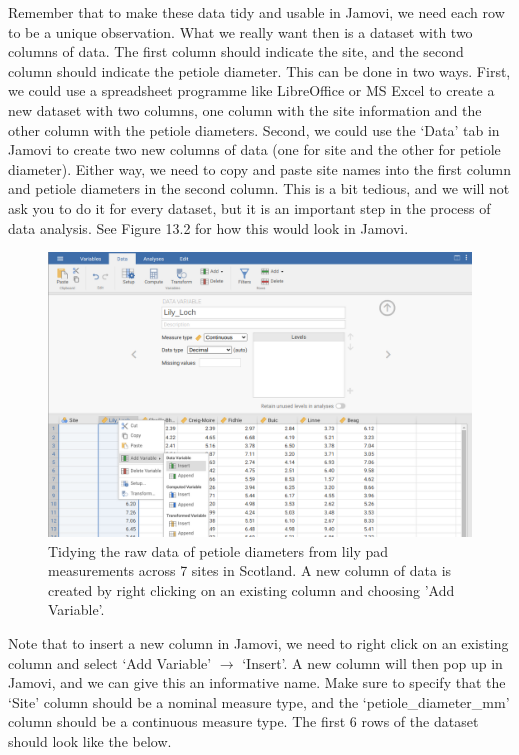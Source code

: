 \documentclass[
]{scrbook}
\begin{document}
Remember that to make these data tidy and usable in Jamovi, we need each row to be a unique observation.
What we really want then is a dataset with two columns of data.
The first column should indicate the site, and the second column should indicate the petiole diameter.
This can be done in two ways.
First, we could use a spreadsheet programme like LibreOffice or MS Excel to create a new dataset with two columns, one column with the site information and the other column with the petiole diameters.
Second, we could use the `Data' tab in Jamovi to create two new columns of data (one for site and the other for petiole diameter).
Either way, we need to copy and paste site names into the first column and petiole diameters in the second column.
This is a bit tedious, and we will not ask you to do it for every dataset, but it is an important step in the process of data analysis.
See Figure 13.2 for how this would look in Jamovi.

\begin{figure}
\includegraphics[width=1\linewidth]{img/lilypad_tidy} \caption{Tidying the raw data of petiole diameters from lily pad measurements across 7 sites in Scotland. A new column of data is created by right clicking on an existing column and choosing 'Add Variable'.}\label{fig:unnamed-chunk-48}
\end{figure}

Note that to insert a new column in Jamovi, we need to right click on an existing column and select `Add Variable' \(\to\) `Insert'.
A new column will then pop up in Jamovi, and we can give this an informative name.
Make sure to specify that the `Site' column should be a nominal measure type, and the `petiole\_diameter\_mm' column should be a continuous measure type.
The first 6 rows of the dataset should look like the below.
\end{document}
